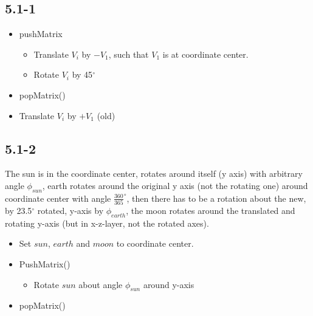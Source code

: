 \documentclass{article}
\begin{document}
\subsection*{5.1-1}
\begin{itemize}
	\item pushMatrix
	\begin{itemize}
	\item Translate $V_i$ by $-V_1$, such that $V_1$ is at coordinate center.
	\item Rotate $V_i$ by 45$^{\circ}$
	\end{itemize}
	\item popMatrix()
	\item Translate $V_i$ by $+V_1$ (old)
\end{itemize}


\subsection*{5.1-2} The sun is in the coordinate center, rotates around itself (y axis) with arbitrary angle $\phi_{sun}$, earth rotates around the original y axis (not the rotating one) around coordinate center with angle  $\frac{360}{365}^{\circ}$, then there has to be a rotation about the new, by 23.5$^{\circ}$ rotated, y-axis by $\phi_{earth}$, the moon rotates around the translated and rotating y-axis (but in x-z-layer, not the rotated axes).
\begin{itemize}
\item Set $sun$, $earth$ and $moon$ to coordinate center.
\item PushMatrix()
\begin{itemize}
\item Rotate $sun$ about angle $\phi_{sun}$ around y-axis
\end{itemize}
\item popMatrix()
\end{itemize}
\end{document}
